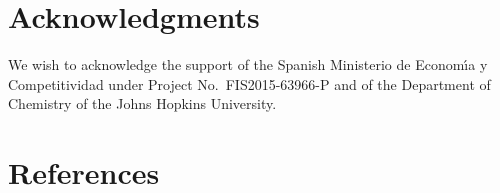 \documentclass[12pt]{iopart}
\begin{document}
\section*{Acknowledgments}
We wish to acknowledge the support of the Spanish Ministerio
de Econom\'{\i}a y Competitividad under Project No.~FIS2015-63966-P
 and of the Department of Chemistry of the Johns Hopkins University.
\section*{References}
%
%
\providecommand{\newblock}{}
\end{document}
